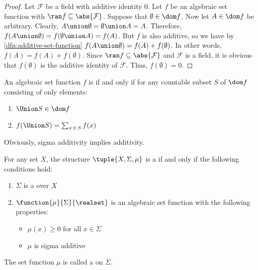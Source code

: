 \begin{proof}
    Let \( \mathcal{F} \) be a field with additive identity \( 0 \). Let \( f \) be an algebraic set function with \( \ran f \subseteq \abs{\mathcal{F}} \).
    Suppose that \( \emptyset \in \dom f \). Now let \( A \in \dom f \) be arbitrary. Clearly, \( A \union \emptyset = \emptyset \union A = A \).
    Therefore, \( f(A \union \emptyset) = f(\emptyset \union A) = f(A) \). But \( f \) is also additive, so we have by \cref{dfn:additive-set-function}
    \( f(A \union \emptyset) = f(A) + f(\emptyset) \). In other words, \( f(A) = f(A) + f(\emptyset) \). Since \( \ran f \subseteq \abs{\mathcal{F}} \)
    and \( \mathcal{F} \) is a field, it is obvious that \( f(\emptyset) \) is the additive identity of \( \mathcal{F} \). Thus, \( f(\emptyset) = 0 \).
\end{proof}

\begin{dfn}
     \label{dfn:sigma-additive-set-function}
    An algebraic set function \( f \) is  if and only if for any
    countable subset \( S \) of \( \dom f \) consisting of only  elements:
    \begin{enumerate}[topsep=2pt,noitemsep,label=\textup{\texttt{(\alph*)}}]
        \item \( \Union S \in \dom f \)
        \item \( f \mleft( \Union S \mright) = \sum_{x \,\in\, S} f(x) \)
    \end{enumerate}
\end{dfn}

\begin{rem}
    Obviously, sigma additivity implies additivity.
\end{rem}

\begin{dfn}
     \label{dfn:measure-space}
    For any set \( X \), the structure \( \tuple{X, \Sigma, \mu} \) is a  if and only if
    the following conditions hold:
    \begin{enumerate}[topsep=2pt,noitemsep,label=\textup{\texttt{(\alph*)}}]
        \item \( \Sigma \) is a  over \( X \)
        \item \( \function{\mu}{\Sigma}{\realset} \) is an algebraic set function with the following properties:
            \begin{itemize}[topsep=2pt]
                \item \( \mu(x) \geq 0 \) for all \( x \in \Sigma \)
                \item \( \mu \) is sigma additive
            \end{itemize}
    \end{enumerate}
    The set function \( \mu \) is called a  on \( \Sigma \).
\end{dfn}

